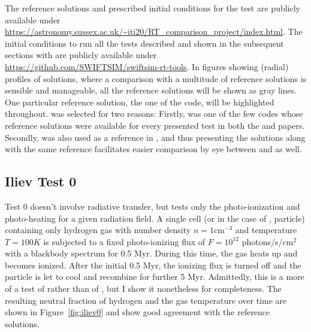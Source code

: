 The reference solutions and prescribed initial conditions for the test are publicly available under
\url{https://astronomy.sussex.ac.uk/~iti20/RT_comparison_project/index.html}.
%
The initial conditions to run all the tests described and shown in the subsequent sections with
\GEARRT are publicly available under \url{https://github.com/SWIFTSIM/swiftsim-rt-tools}.
In figures showing (radial) profiles of solutions, where a comparison with a multitude of reference
solutions is sensible and manageable, all the reference solutions will be shown as gray lines. One
particular reference solution, the one of the  code, will be highlighted
throughout.  was selected for two reasons: Firstly,  was one of the
few codes whose reference solutions were available for every presented test in both the
\citet{ilievCosmologicalRadiativeTransfer2006} and \citet{ilievCosmologicalRadiativeTransfer2009}
papers. Secondly,  was also used as a reference in \citet{ramses-rt13}, and thus
presenting the solutions along with the same reference facilitates easier comparison by eye between
\GEARRT and  as well.















\subsection{Iliev Test 0}\label{chap:Iliev0}


Test 0 doesn't involve radiative transfer, but tests only the photo-ionization and photo-heating for
a given radiation field. A single cell (or in the case of \GEARRT, particle) containing only
hydrogen gas with number density $n = 1$cm$^{-3}$ and temperature $T = 100K$ is subjected to a
fixed photo-ionizing flux of $F = 10^{12}$ photons/s/cm$^2$ with a blackbody spectrum for 0.5 Myr.
During this time, the gas heats up and becomes ionized. After the initial 0.5 Myr, the ionizing flux
is turned off and the particle is let to cool and recombine for further 5 Myr. Admittedly, this
is a more of a test of \grackle rather than of \GEARRT, but I show it nonetheless for completeness.
The resulting neutral fraction of hydrogen and the gas temperature over time are shown in
Figure~\ref{fig:iliev0} and show good agreement with the reference solutions.


